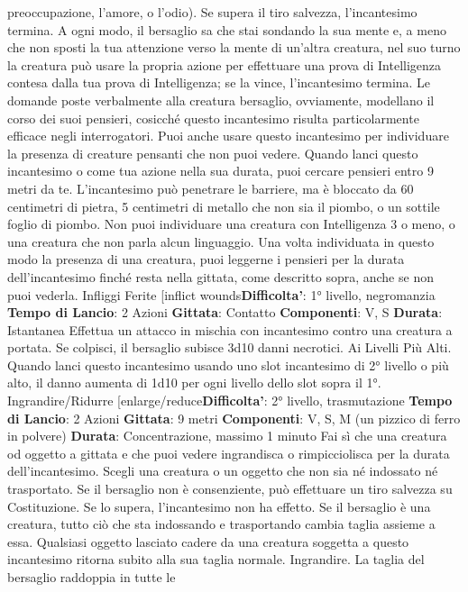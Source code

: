 \begin{multicols}{2}
preoccupazione, l’amore, o l’odio). Se supera il tiro
salvezza, l’incantesimo termina. A ogni modo, il
bersaglio sa che stai sondando la sua mente e, a meno
che non sposti la tua attenzione verso la mente di
un’altra creatura, nel suo turno la creatura può usare la
propria azione per effettuare una prova di Intelligenza
contesa dalla tua prova di Intelligenza; se la vince,
l’incantesimo termina.
Le domande poste verbalmente alla creatura bersaglio,
ovviamente, modellano il corso dei suoi pensieri,
cosicché questo incantesimo risulta particolarmente
efficace negli interrogatori.
Puoi anche usare questo incantesimo per individuare la
presenza di creature pensanti che non puoi vedere.
Quando lanci questo incantesimo o come tua azione
nella sua durata, puoi cercare pensieri entro 9 metri da
te. L’incantesimo può penetrare le barriere, ma è
bloccato da 60 centimetri di pietra, 5 centimetri di
metallo che non sia il piombo, o un sottile foglio di
piombo. Non puoi individuare una creatura con
Intelligenza 3 o meno, o una creatura che non parla
alcun linguaggio.
Una volta individuata in questo modo la presenza di
una creatura, puoi leggerne i pensieri per la durata
dell’incantesimo finché resta nella gittata, come
descritto sopra, anche se non puoi vederla.
Infliggi Ferite
[inflict wounds\textbf{Difficolta'}:
1° livello, negromanzia
\textbf{Tempo di Lancio}: 2 Azioni
\textbf{Gittata}: Contatto
\textbf{Componenti}: V, S
\textbf{Durata}: Istantanea
Effettua un attacco in mischia con incantesimo contro
una creatura a portata. Se colpisci, il bersaglio subisce
3d10 danni necrotici.
Ai Livelli Più Alti. Quando lanci questo incantesimo
usando uno slot incantesimo di 2° livello o più alto, il
danno aumenta di 1d10 per ogni livello dello slot sopra
il 1°.
Ingrandire/Ridurre
[enlarge/reduce\textbf{Difficolta'}:
2° livello, trasmutazione
\textbf{Tempo di Lancio}: 2 Azioni
\textbf{Gittata}: 9 metri
\textbf{Componenti}: V, S, M (un pizzico di ferro in polvere)
\textbf{Durata}: Concentrazione, massimo 1 minuto
Fai sì che una creatura od oggetto a gittata e che puoi
vedere ingrandisca o rimpicciolisca per la durata
dell’incantesimo. Scegli una creatura o un oggetto che
non sia né indossato né trasportato. Se il bersaglio non
è consenziente, può effettuare un tiro salvezza su
Costituzione. Se lo supera, l’incantesimo non ha effetto.
Se il bersaglio è una creatura, tutto ciò che sta
indossando e trasportando cambia taglia assieme a
essa. Qualsiasi oggetto lasciato cadere da una creatura
soggetta a questo incantesimo ritorna subito alla sua
taglia normale.
Ingrandire. La taglia del bersaglio raddoppia in tutte le

\end{multicols}
